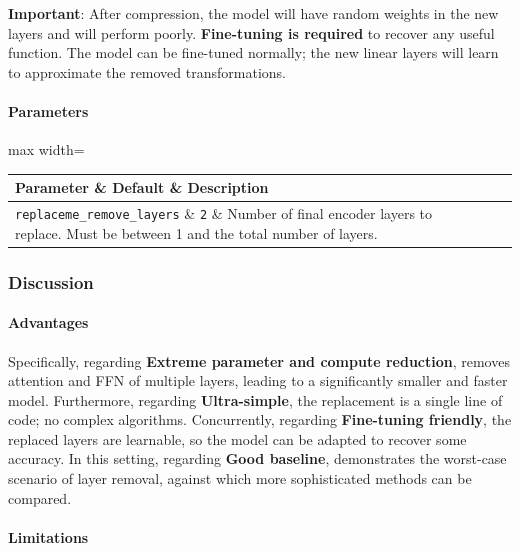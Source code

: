 \textbf{Important}: After compression, the model will have random weights in the new layers and will perform poorly. \textbf{Fine-tuning is required} to recover any useful function. The model can be fine-tuned normally; the new linear layers will learn to approximate the removed transformations.

\paragraph{Parameters}

\begin{center}
\begin{adjustbox}{max width=\columnwidth}
\renewcommand{\arraystretch}{1.2}
\begin{tabular}{lll}
\toprule
Parameter \& Default \& Description \\
\midrule
\texttt{replaceme\_remove\_layers} \& \texttt{2} \& Number of final encoder layers to replace. Must be between 1 and the total number of layers. \\

\bottomrule
\end{tabular}
\end{adjustbox}
\end{center}

\subsubsection*{Discussion}

\paragraph{Advantages}

Specifically, regarding \textbf{Extreme parameter and compute reduction}, removes attention and FFN of multiple layers, leading to a significantly smaller and faster model. Furthermore, regarding \textbf{Ultra-simple}, the replacement is a single line of code; no complex algorithms. Concurrently, regarding \textbf{Fine-tuning friendly}, the replaced layers are learnable, so the model can be adapted to recover some accuracy. In this setting, regarding \textbf{Good baseline}, demonstrates the worst-case scenario of layer removal, against which more sophisticated methods can be compared.


\paragraph{Limitations}

